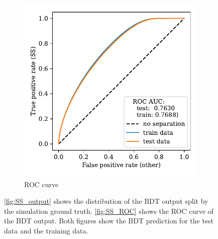 \begin{figure}
\begin{subfigure}{0.5\textwidth}
        \includegraphics[width=\textwidth]{images/SS_ROC.pdf}
        \caption{ROC curve}
        \label{fig:SS_ROC}
    \end{subfigure}%
    \caption{\autoref{fig:SS_output} shows the distribution of the BDT output split by the simulation ground truth. \autoref{fig:SS_ROC} shows the ROC curve of the BDT output. Both figures show the BDT prediction for the test data and the training data.}
\end{figure}
